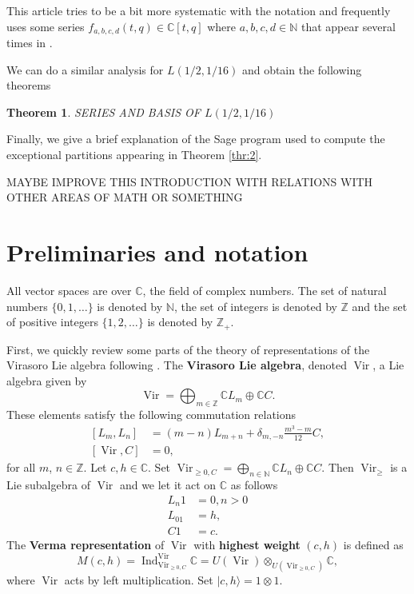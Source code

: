 \documentclass[12pt,a4paper]{article}
\newtheorem{theorem}{Theorem}
\DeclareMathOperator{\Vir}{Vir}
\DeclareMathOperator{\Ind}{Ind}
\begin{document}
This article tries to be a bit more systematic with the notation and frequently uses some series $f_{a,b,c,d}(t,q)\in \mathbb{C}[t,q]$ where $a,b,c,d\in \mathbb{N}$ that appear several times in \cite{andrews_singular_2022}.


We can do a similar analysis for $L(1/2,1/16)$ and obtain the following theorems

\begin{theorem}
  \label{thr:5}
  SERIES AND BASIS OF $L(1/2,1/16)$
\end{theorem}

Finally, we give a brief explanation of the Sage program used to compute the exceptional partitions appearing in Theorem \ref{thr:2}.

MAYBE IMPROVE THIS INTRODUCTION WITH RELATIONS WITH OTHER AREAS OF MATH OR SOMETHING

\section{Preliminaries and notation}
\label{sec:prel-notat}
All vector spaces are over $\mathbb{C}$, the field of complex numbers.
The set of natural numbers $\{0,1,\dots\}$ is denoted by $\mathbb{N}$, the set of integers is denoted by $\mathbb{Z}$ and the set of positive integers $\{1,2,\dots\}$ is denoted by $\mathbb{Z}_+$.

First, we quickly review some parts of the theory of representations of the Virasoro Lie algebra following \cite{kac_bombay_2013}.
The \textbf{Virasoro Lie algebra}, denoted $\Vir$, a Lie algebra given by
\begin{equation*}
  \Vir=\bigoplus_{m\in \mathbb{Z}}\mathbb{C}L_m\oplus \mathbb{C}C.
\end{equation*}
These elements satisfy the following commutation relations
\begin{align}
  \label{eq:1}
  [L_m,L_n]&=(m-n)L_{m+n}+\delta_{m,-n}\frac{m^3-m}{12}C, \\
  \nonumber
  [\Vir,C]&=0, 
\end{align}
for all $m$, $n\in \mathbb{Z}$.
Let $c,h\in \mathbb{C}$.
Set $\Vir_{\ge 0,C}=\bigoplus_{n\in \mathbb{N}}\mathbb{C}L_n\oplus \mathbb{C}C$.
Then $\Vir_\ge$ is a Lie subalgebra of $\Vir$ and we let it act on $\mathbb{C}$ as follows
\begin{align*}
  L_n1&=0, n>0 \\
  L_01&=h, \\
  C1&=c.
\end{align*}
The \textbf{Verma representation} of $\Vir$ with \textbf{highest weight} $(c,h)$ is defined as 
\begin{equation*}
  M(c,h)=\Ind^{\Vir}_{\Vir_{\ge 0,C}}\mathbb{C}=U(\Vir)\otimes_{U(\Vir_{\ge 0,C})}\mathbb{C},
\end{equation*}
where $\Vir$ acts by left multiplication.
Set $|c,h\rangle=1\otimes 1$.
\end{document}
